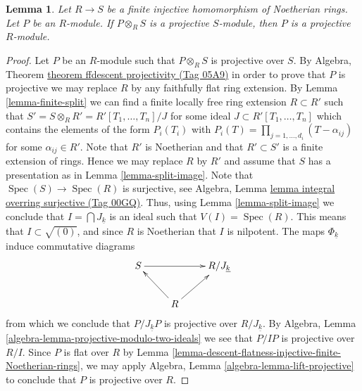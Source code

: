 \documentclass{amsart}
\theoremstyle{plain}
\newtheorem{lemma}[subsection]{Lemma}
\theoremstyle{definition}
\theoremstyle{remark}
\numberwithin{equation}{subsection}
\def\Spec{\mathop{\mathrm{Spec}}}
\begin{document}
\begin{lemma}
\label{lemma-descent-projective-injective-finite-Noetherian-rings}
Let $R \to S$ be a finite injective homomorphism of Noetherian rings.
Let $P$ be an $R$-module. If $P \otimes_R S$ is a projective $S$-module,
then $P$ is a projective $R$-module.
\end{lemma}

\begin{proof}
Let $P$ be an $R$-module such that $P \otimes_R S$ is projective over $S$. By
Algebra, Theorem \href{https://stacks.math.columbia.edu/tag/05A9}{theorem ffdescent projectivity (Tag 05A9)}
in order to prove that $P$ is projective we may replace $R$
by any faithfully flat ring extension. By
Lemma \ref{lemma-finite-split}
we can find a finite locally free ring extension $R \subset R'$ such
that $S' = S \otimes_R R' = R'[T_1, \ldots, T_n]/J$ for some ideal
$J \subset R'[T_1, \ldots, T_n]$ which contains the  elements of the form
$P_i(T_i)$ with $P_i(T) = \prod_{j = 1, \ldots, d_i} (T - \alpha_{ij})$
for some $\alpha_{ij} \in R'$. Note that $R'$ is Noetherian
and that $R' \subset S'$ is a finite extension of rings. Hence we may
replace $R$ by $R'$ and assume that $S$ has a presentation as in
Lemma \ref{lemma-split-image}.
Note that $\Spec(S) \to \Spec(R)$ is surjective, see
Algebra, Lemma \href{https://stacks.math.columbia.edu/tag/00GQ}{lemma integral overring surjective (Tag 00GQ)}.
Thus, using Lemma \ref{lemma-split-image}
we conclude that $I = \bigcap J_{\underline{k}}$ is an ideal
such that $V(I) = \Spec(R)$. This means that
$I \subset \sqrt{(0)}$, and since $R$ is Noetherian that $I$
is nilpotent. The maps $\Phi_{\underline{k}}$ induce commutative
diagrams
$$
\xymatrix{
S \ar[rr] & & R/J_{\underline{k}} \\
& R \ar[lu] \ar[ru]
}
$$
from which we conclude that $P/J_{\underline{k}}P$ is projective over
$R/J_{\underline{k}}$. By
Algebra, Lemma \ref{algebra-lemma-projective-modulo-two-ideals}
we see that $P/IP$ is projective over $R/I$. Since $P$ is flat
over $R$ by
Lemma \ref{lemma-descent-flatness-injective-finite-Noetherian-rings},
we may apply Algebra, Lemma \ref{algebra-lemma-lift-projective} to
conclude that $P$ is projective over $R$.
\end{proof}
\end{document}
